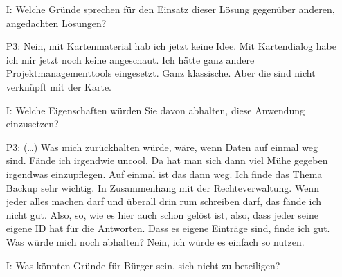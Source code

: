 \begin{itemize}
    Zum Beispiel eine BASF, ein Flughafen. Also Unternehmen, die {\"u}ber sehr weitr{\"a}umiges Gel{\"a}nde verf{\"u}gen und mal schnell irgendwie was auch lokal ver{\"a}ndern wollen, und sagen "Hey, an der Stelle, da ist dies und jenes" Wo man sein Ideenmanagement vielleicht auch zusammen mit der Lokalisierung macht. Das ist ja Kartenmaterial, vielleicht noch eine Frage: Ist das von Google? (Nein das ist von Openstreetmap.) Okay, das hei{\ss}t also weltweit? (Ja) Das hei{\ss}t, ich kann auch mit Unternehmen arbeiten, die weltweit operieren (Richtig.) Genau. Ja das w{\"a}re auch gut. Wenn man dann Ideen hat, "Hey, ich arbeite hier in M{\"u}nster, aber in der amerikanischen Niederlassung. Ich komm gerade wieder. Da habe ich gesehen, in der Einheit, da funktioniert irgendwas nicht. Und ich mache da irgendwie ein Todo-Marker rein an die Stelle" Und dann guckt irgendwie so ein Global-Todo-Manager drauf und sagt "Hey, wo sind denn so Open Issues" und sieht die. An einer Stelle, wo irgendwas ist, was getan werden muss. Das finde ich gut.
    \item[I:] Welche Gr{\"u}nde sprechen f{\"u}r den Einsatz dieser L{\"o}sung gegen{\"u}ber anderen, angedachten L{\"o}sungen?
    \item[P3:] Nein, mit Kartenmaterial hab ich jetzt keine Idee. Mit Kartendialog habe ich mir jetzt noch keine angeschaut. Ich h{\"a}tte ganz andere Projektmanagementtools eingesetzt. Ganz klassische. Aber die sind nicht verkn{\"u}pft mit der Karte.
    \item[I:] Welche Eigenschaften w{\"u}rden Sie davon abhalten, diese Anwendung einzusetzen?
    \item[P3:] (\dots) Was mich zur{\"u}ckhalten w{\"u}rde, w{\"a}re, wenn Daten auf einmal weg sind. F{\"a}nde ich irgendwie uncool. Da hat man sich dann viel M{\"u}he gegeben irgendwas einzupflegen. Auf einmal ist das dann weg. Ich finde das Thema Backup sehr wichtig. In Zusammenhang mit der Rechteverwaltung. Wenn jeder alles machen darf und {\"u}berall drin rum schreiben darf, das f{\"a}nde ich nicht gut. Also, so, wie es hier auch schon gel{\"o}st ist, also, dass jeder seine eigene ID hat f{\"u}r die Antworten. Dass es eigene Eintr{\"a}ge sind, finde ich gut. Was w{\"u}rde mich noch abhalten? Nein, ich w{\"u}rde es einfach so nutzen.
    \item[I:] Was k{\"o}nnten Gr{\"u}nde f{\"u}r B{\"u}rger sein, sich nicht zu beteiligen?

\end{itemize}
